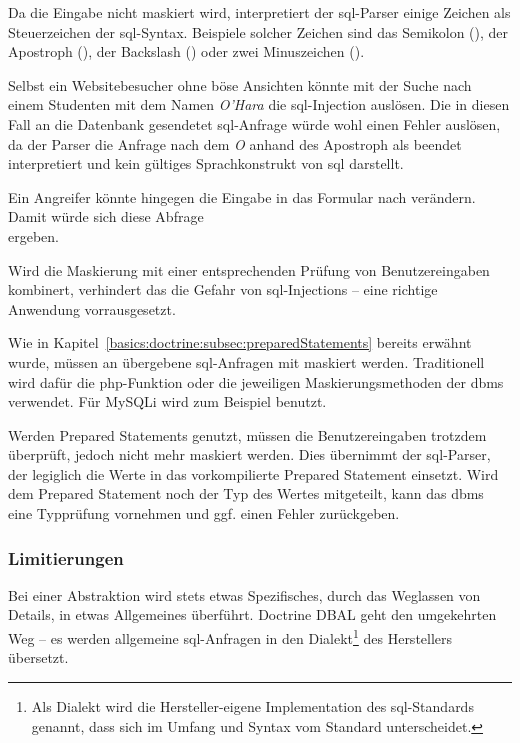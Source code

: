Da die Eingabe nicht maskiert wird, interpretiert der \gls{sql}-Parser einige Zeichen als Steuerzeichen der \gls{sql}-Syntax. Beispiele solcher Zeichen sind das Semikolon (\pdf{;}), der Apostroph (), der Backslash (\pdf{\textbackslash}) oder zwei Minuszeichen (\pdf{--}).

Selbst ein Websitebesucher ohne böse Ansichten könnte mit der Suche nach einem Studenten mit dem Namen \textit{O'Hara} die \gls{sql}-Injection auslösen. Die in diesen Fall an die Datenbank gesendetet \gls{sql}-Anfrage  würde wohl einen Fehler auslösen, da der Parser die Anfrage nach dem \textit{O} anhand des Apostroph als beendet interpretiert und  kein gültiges Sprachkonstrukt von \gls{sql} darstellt.

Ein Angreifer könnte hingegen die Eingabe in das Formular nach  verändern. Damit würde sich diese Abfrage\\  ergeben.

Wird die Maskierung mit einer entsprechenden Prüfung von Benutzereingaben kombinert, verhindert das die Gefahr von \gls{sql}-Injections – eine richtige Anwendung vorrausgesetzt.

Wie in Kapitel~\ref{basics:doctrine:subsec:preparedStatements} bereits erwähnt wurde, müssen an  übergebene \gls{sql}-Anfragen mit  maskiert werden. Traditionell wird dafür die \gls{php}-Funktion  oder die jeweiligen Maskierungsmethoden der \gls{dbms} verwendet. Für MySQLi wird zum Beispiel  benutzt.

Werden Prepared Statements genutzt, müssen die Benutzereingaben trotzdem überprüft, jedoch nicht mehr maskiert werden. Dies übernimmt der \gls{sql}-Parser, der legiglich die Werte in das vorkompilierte Prepared Statement einsetzt. Wird dem Prepared Statement noch der Typ des Wertes mitgeteilt, kann das \gls{dbms} eine Typprüfung vornehmen und ggf. einen Fehler zurückgeben.

\subsubsection{Limitierungen}
\label{basics:doctrine:subsubsec:limitsOfAbstraction}
Bei einer Abstraktion wird stets etwas Spezifisches, durch das Weglassen von Details, in etwas Allgemeines überführt. Doctrine DBAL geht den umgekehrten Weg – es werden allgemeine \gls{sql}-Anfragen in den Dialekt\footnote{Als Dialekt wird die Hersteller-eigene Implementation des \gls{sql}-Standards genannt, dass sich im Umfang und Syntax vom Standard unterscheidet.} des Herstellers übersetzt.

